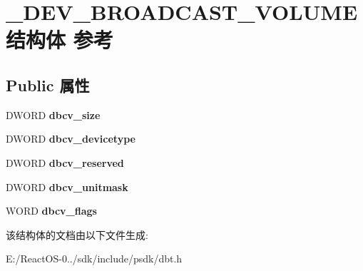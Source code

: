 \hypertarget{struct___d_e_v___b_r_o_a_d_c_a_s_t___v_o_l_u_m_e}{}\section{\+\_\+\+D\+E\+V\+\_\+\+B\+R\+O\+A\+D\+C\+A\+S\+T\+\_\+\+V\+O\+L\+U\+M\+E结构体 参考}
\label{struct___d_e_v___b_r_o_a_d_c_a_s_t___v_o_l_u_m_e}
\subsection*{Public 属性}
\begin{DoxyCompactItemize}
\item 
\mbox{\label{struct___d_e_v___b_r_o_a_d_c_a_s_t___v_o_l_u_m_e_a8f84aca86e20d212e405581571ea496f}} 
D\+W\+O\+RD {\bfseries dbcv\+\_\+size}
\item 
\mbox{\label{struct___d_e_v___b_r_o_a_d_c_a_s_t___v_o_l_u_m_e_ae25aa41cbd79bfd815a2fc6f1c2edf3f}} 
D\+W\+O\+RD {\bfseries dbcv\+\_\+devicetype}
\item 
\mbox{\label{struct___d_e_v___b_r_o_a_d_c_a_s_t___v_o_l_u_m_e_a43d2f4913b3095a848c8e2580ad88c9d}} 
D\+W\+O\+RD {\bfseries dbcv\+\_\+reserved}
\item 
\mbox{\label{struct___d_e_v___b_r_o_a_d_c_a_s_t___v_o_l_u_m_e_ac53f6b393fbcaeadddb9d90f1c6ea417}} 
D\+W\+O\+RD {\bfseries dbcv\+\_\+unitmask}
\item 
\mbox{\label{struct___d_e_v___b_r_o_a_d_c_a_s_t___v_o_l_u_m_e_aee2c8c74729a8128d71b26d1bf5e9d24}} 
W\+O\+RD {\bfseries dbcv\+\_\+flags}
\end{DoxyCompactItemize}


该结构体的文档由以下文件生成\+:\begin{DoxyCompactItemize}
\item 
E\+:/\+React\+O\+S-\/0../sdk/include/psdk/dbt.\+h\end{DoxyCompactItemize}
